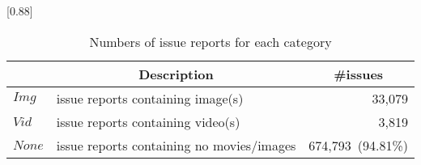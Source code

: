 
\begin{table}[t]
    \begin{center}
    \caption{Numbers of issue reports for each category}
    \scalebox{0.88}[0.88]{
    \begin{tabular}{llr}
        \toprule
         & \multicolumn{1}{c}{\textbf{Description}} & \multicolumn{1}{c}{\textbf{\#issues}} \\
        \midrule
        $Img$  & issue reports containing image(s) & 33,079\hspace{2.5mm}{\small (4.65\%)}\\%
        $Vid$  & issue reports containing video(s) & 3,819\hspace{2.5mm}{\small (0.54\%)}\\%
        $None$ & issue reports containing no movies/images & 674,793~{\small (94.81\%)}\\ 
        \bottomrule
    \end{tabular}
    }
    \label{tab:issue-category}
    \end{center}
    
\end{table}

